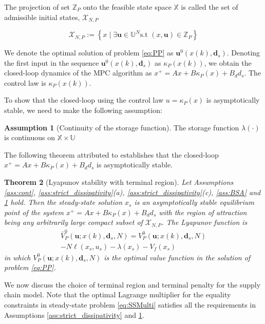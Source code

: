\documentclass[10pt]{article}
\newcommand{\bu}{\mathbf{u}}
\newcommand{\bd}{\mathbf{d}}
\newcommand{\set}[1]{\left\lbrace #1 \right\rbrace}
\newtheorem{theorem}{Theorem}
\theoremstyle{definition}
\newtheorem{assumption}[theorem]{Assumption}
\begin{document}
The projection of set $\mathbb{Z}_P$ onto the feasible state space
$\mathbb{X}$ is called the set of admissible initial states,
$\mathcal{X}_{N,P}$


\[\mathcal{X}_{N,P} := \set{x \mid \exists \bu \in \mathbb{U}^N
  \text{s.t~} (x,\bu) \in \mathbb{Z}_P} \]

We denote the optimal solution of problem \eqref{eq:PP} as
$\bu^0(x(k),\bd_s)$. Denoting the first input in the sequence
$\bu^0(x(k),\bd_s)$ as $\kappa_P(x(k))$, we obtain the closed-loop
dynamics of the MPC algorithm as $x^+ = Ax+B\kappa_P(x)+B_dd_s$.  The
control law is $\kappa_P(x(k))$.

To show that the closed-loop using the control law $u = \kappa_P(x)$
is asymptotically stable, we need to make the following  assumption:

\begin{assumption}[Continuity of the storage function]
\label{ass:cont_lambda}
The storage function $\lambda(\cdot)$ is continuous on $\mathbb{X}
\times  \mathbb{U}$
\end{assumption}

The following theorem attributed to \citet{amrit:rawlings:angeli:2011}
establishes that the closed-loop $x^+ = Ax+B\kappa_P(x)+B_dd_s$ is
asymptotically stable.

\begin{theorem}[Lyapunov stability with terminal region]
Let Assumptions \ref{ass:cont}, \ref{ass:strict_dissipativity}(a),
\ref{ass:strict_dissipativity}(c), \ref{ass:BSA} and
\ref{ass:cont_lambda} hold. Then the steady-state solution $x_s$ is an
asymptotically stable equilibrium point of the system
$x^+=Ax+B\kappa_P(x)+B_dd_s$ with the region of attraction being any
arbitrarily large compact subset of $\mathcal{X}_{N,P}$. The Lyapunov
function is \begin{multline*}\bar{V}_P^0(\bu;x(k),\bd_s,N) =
V_P^0(\bu;x(k),\bd_s,N)\\-N\ell(x_s,u_s)-\lambda(x_s)-V_f(x_s)\end{multline*} in which
$V_P^0(\bu;x(k),\bd_s,N)$ is the optimal value function in the solution
of problem \eqref{eq:PP}.
\end{theorem}

We now discuss the choice of terminal region and terminal penalty for
the supply chain model. Note that the optimal Lagrange multiplier for
the equality constraints in steady-state problem \eqref{eq:SSMulti}
satisfies all the requirements in Assumptions
\ref{ass:strict_dissipativity} and \ref{ass:cont_lambda}. 
\end{document}
